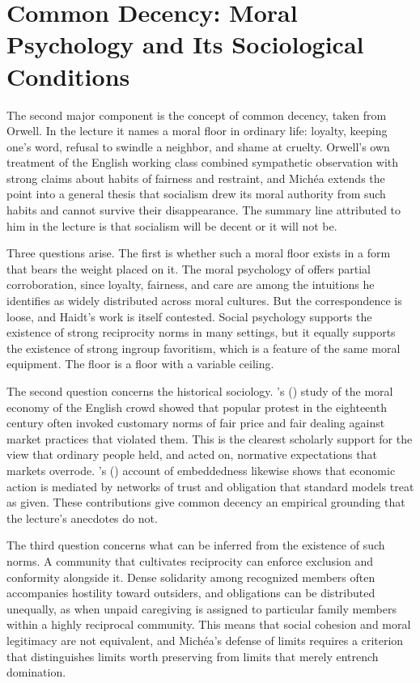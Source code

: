 \documentclass[12pt]{article}
\begin{document}
\section{Common Decency: Moral Psychology and Its Sociological Conditions}
\label{sec:decency}

The second major component is the concept of common decency, taken from Orwell. In the lecture it names a moral floor in ordinary life: loyalty, keeping one's word, refusal to swindle a neighbor, and shame at cruelty. Orwell's own treatment of the English working class \citep{orwell37,orwell41} combined sympathetic observation with strong claims about habits of fairness and restraint, and Michéa extends the point into a general thesis that socialism drew its moral authority from such habits and cannot survive their disappearance. The summary line attributed to him in the lecture is that socialism will be decent or it will not be.

Three questions arise. The first is whether such a moral floor exists in a form that bears the weight placed on it. The moral psychology of \citet{haidt} offers partial corroboration, since loyalty, fairness, and care are among the intuitions he identifies as widely distributed across moral cultures. But the correspondence is loose, and Haidt's work is itself contested. Social psychology supports the existence of strong reciprocity norms in many settings, but it equally supports the existence of strong ingroup favoritism, which is a feature of the same moral equipment. The floor is a floor with a variable ceiling.

The second question concerns the historical sociology. \citeauthor{thompson}'s (\citeyear{thompson}) study of the moral economy of the English crowd showed that popular protest in the eighteenth century often invoked customary norms of fair price and fair dealing against market practices that violated them. This is the clearest scholarly support for the view that ordinary people held, and acted on, normative expectations that markets overrode. \citeauthor{granovetter}'s (\citeyear{granovetter}) account of embeddedness likewise shows that economic action is mediated by networks of trust and obligation that standard models treat as given. These contributions give common decency an empirical grounding that the lecture's anecdotes do not.

The third question concerns what can be inferred from the existence of such norms. A community that cultivates reciprocity can enforce exclusion and conformity alongside it. Dense solidarity among recognized members often accompanies hostility toward outsiders, and obligations can be distributed unequally, as when unpaid caregiving is assigned to particular family members within a highly reciprocal community. This means that social cohesion and moral legitimacy are not equivalent, and Michéa's defense of limits requires a criterion that distinguishes limits worth preserving from limits that merely entrench domination.
\end{document}
